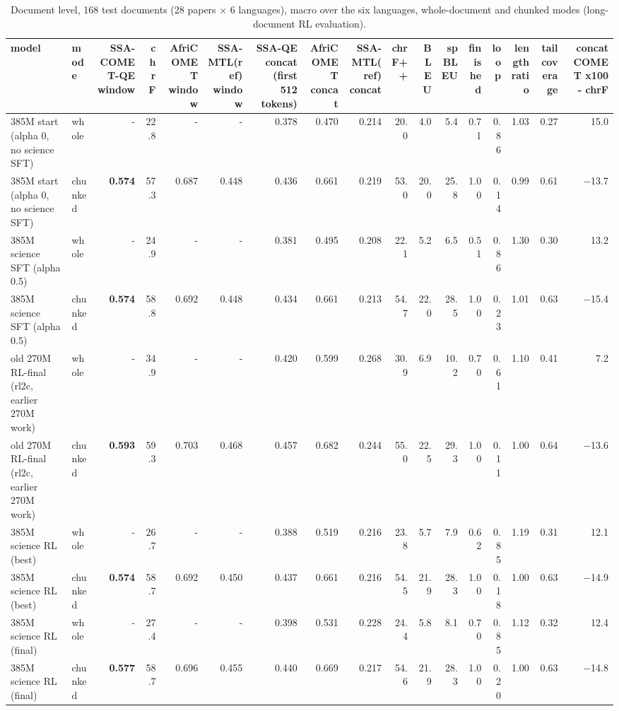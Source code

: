 \begin{table}[t]
\centering\scriptsize
\setlength{\tabcolsep}{4pt}
\caption{Document level, 168 test documents (28 papers $\times$ 6 languages), macro over the six languages, whole-document and chunked modes (long-document RL evaluation).}\label{tab:doc-whole}
\begin{adjustbox}{max width=\linewidth}\begin{tabular}{@{}llrrrrrrrrrrrrrrr@{}}
\toprule
model & mode & \textbf{SSA-COMET-QE window} & chrF & AfriCOMET window & SSA-MTL(ref) window & SSA-QE concat (first 512 tokens) & AfriCOMET concat & SSA-MTL(ref) concat & chrF++ & BLEU & spBLEU & finished & loop & length ratio & tail coverage & concat COMET x100 - chrF \\
\midrule
385M start (alpha 0, no science SFT) & whole & - & 22.8 & - & - & 0.378 & 0.470 & 0.214 & 20.0 & 4.0 & 5.4 & 0.71 & 0.86 & 1.03 & 0.27 & 15.0 \\
385M start (alpha 0, no science SFT) & chunked & \textbf{0.574} & 57.3 & 0.687 & 0.448 & 0.436 & 0.661 & 0.219 & 53.0 & 20.0 & 25.8 & 1.00 & 0.14 & 0.99 & 0.61 & \ensuremath{-}13.7 \\
385M science SFT (alpha 0.5) & whole & - & 24.9 & - & - & 0.381 & 0.495 & 0.208 & 22.1 & 5.2 & 6.5 & 0.51 & 0.86 & 1.30 & 0.30 & 13.2 \\
385M science SFT (alpha 0.5) & chunked & \textbf{0.574} & 58.8 & 0.692 & 0.448 & 0.434 & 0.661 & 0.213 & 54.7 & 22.0 & 28.5 & 1.00 & 0.23 & 1.01 & 0.63 & \ensuremath{-}15.4 \\
old 270M RL-final (rl2c, earlier 270M work) & whole & - & 34.9 & - & - & 0.420 & 0.599 & 0.268 & 30.9 & 6.9 & 10.2 & 0.70 & 0.61 & 1.10 & 0.41 & 7.2 \\
old 270M RL-final (rl2c, earlier 270M work) & chunked & \textbf{0.593} & 59.3 & 0.703 & 0.468 & 0.457 & 0.682 & 0.244 & 55.0 & 22.5 & 29.3 & 1.00 & 0.11 & 1.00 & 0.64 & \ensuremath{-}13.6 \\
385M science RL (best) & whole & - & 26.7 & - & - & 0.388 & 0.519 & 0.216 & 23.8 & 5.7 & 7.9 & 0.62 & 0.85 & 1.19 & 0.31 & 12.1 \\
385M science RL (best) & chunked & \textbf{0.574} & 58.7 & 0.692 & 0.450 & 0.437 & 0.661 & 0.216 & 54.5 & 21.9 & 28.3 & 1.00 & 0.18 & 1.00 & 0.63 & \ensuremath{-}14.9 \\
385M science RL (final) & whole & - & 27.4 & - & - & 0.398 & 0.531 & 0.228 & 24.4 & 5.8 & 8.1 & 0.70 & 0.85 & 1.12 & 0.32 & 12.4 \\
385M science RL (final) & chunked & \textbf{0.577} & 58.7 & 0.696 & 0.455 & 0.440 & 0.669 & 0.217 & 54.6 & 21.9 & 28.3 & 1.00 & 0.20 & 1.00 & 0.63 & \ensuremath{-}14.8 \\

\end{tabular}
\end{adjustbox}
\end{table}
